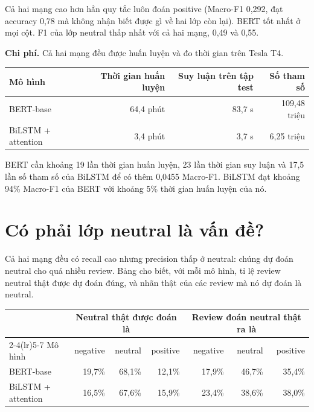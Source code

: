 Cả hai mạng cao hơn hẳn quy tắc luôn đoán positive (Macro-F1 0,292, đạt accuracy 0,78 mà không nhận biết được gì về hai lớp còn lại). BERT tốt nhất ở mọi cột. F1 của lớp neutral thấp nhất với cả hai mạng, 0,49 và 0,55.

\textbf{Chi phí.} Cả hai mạng đều được huấn luyện và đo thời gian trên Tesla T4.

\begin{center}
\small
\begin{tabular}{@{}lrrr@{}}
    \toprule
    Mô hình & Thời gian huấn luyện & Suy luận trên tập test & Số tham số \\
    \midrule
    BERT-base & 64,4 phút & 83,7 s & 109,48 triệu \\
    BiLSTM + attention & 3,4 phút & 3,7 s & 6,25 triệu \\
    \bottomrule
\end{tabular}
\end{center}

BERT cần khoảng 19 lần thời gian huấn luyện, 23 lần thời gian suy luận và 17,5 lần số tham số của BiLSTM để có thêm 0,0455 Macro-F1. BiLSTM đạt khoảng 94\% Macro-F1 của BERT với khoảng 5\% thời gian huấn luyện của nó.

\section{Có phải lớp neutral là vấn đề?}
\label{sec:7-3}

Cả hai mạng đều có recall cao nhưng precision thấp ở neutral: chúng dự đoán neutral cho quá nhiều review. Bảng cho biết, với mỗi mô hình, tỉ lệ review neutral thật được dự đoán đúng, và nhãn thật của các review mà nó dự đoán là neutral.

\begin{center}
\small
\begin{tabular}{@{}lrrrrrr@{}}
    \toprule
     & \multicolumn{3}{c}{Neutral thật được đoán là} & \multicolumn{3}{c}{Review đoán neutral thật ra là} \\
    \cmidrule(lr){2-4}\cmidrule(lr){5-7}
    Mô hình & negative & neutral & positive & negative & neutral & positive \\
    \midrule
    BERT-base & 19,7\% & 68,1\% & 12,1\% & 17,9\% & 46,7\% & 35,4\% \\
    BiLSTM + attention & 16,5\% & 67,6\% & 15,9\% & 23,4\% & 38,6\% & 38,0\% \\
    \bottomrule
\end{tabular}
\end{center}

